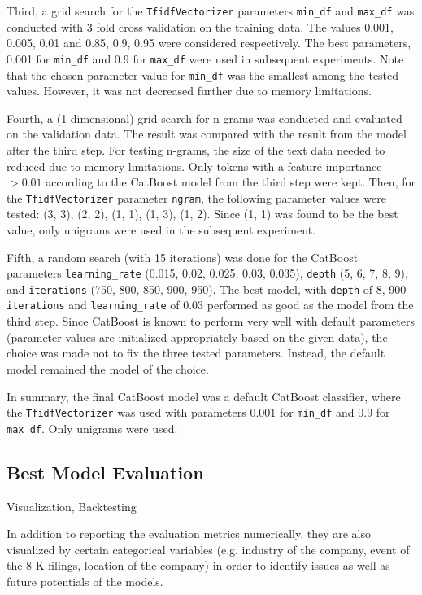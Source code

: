 \documentclass{article}
\begin{document}
	Third, a grid search for the \lstinline{TfidfVectorizer} parameters \lstinline{min_df} and \lstinline{max_df} was conducted with 3 fold cross validation on the training data. The values 0.001, 0.005, 0.01 and 0.85, 0.9, 0.95 were considered	respectively. The best parameters, 0.001 for \lstinline{min_df} and 0.9 for \lstinline{max_df} were used in subsequent experiments. Note that the chosen parameter value for \lstinline{min_df} was the smallest among the tested values. However, it was not decreased further due to memory limitations.
	
	Fourth, a (1 dimensional) grid search for n-grams was conducted and evaluated on the validation data. The result was compared with the result from the model after the third step. For testing n-grams, the size of the text data needed to reduced due to memory limitations. Only tokens with a feature importance $>0.01$ according to the CatBoost model from the third step were kept. Then, for the \lstinline{TfidfVectorizer} parameter \lstinline{ngram}, the following parameter values were tested: (3, 3), (2, 2), (1, 1), 
	(1, 3), (1, 2). Since (1, 1) was found to be the best value, only unigrams were used in the subsequent experiment.
	
	Fifth, a random search (with 15 iterations) was done for the CatBoost parameters \lstinline{learning_rate} (0.015, 0.02, 0.025, 0.03, 0.035), \lstinline{depth} (5, 6, 7, 8, 9), and \lstinline{iterations} (750, 800, 850, 900, 950). The best model, with \lstinline{depth} of 8, 900 \lstinline{iterations} and \lstinline{learning_rate} of 0.03 performed as good as the model from the third step. Since CatBoost is known to perform very well with default parameters (parameter values are initialized appropriately based on the given data), the choice was made not to fix the three tested parameters. Instead, the default model remained the model of the choice.
	
	In summary, the final CatBoost model was a default CatBoost classifier, where the \lstinline{TfidfVectorizer} was used with parameters 0.001 for \lstinline{min_df} and 0.9 for \lstinline{max_df}. Only unigrams were used.
	

	\subsection{Best Model Evaluation}
	
	Visualization, Backtesting
	
	In addition to reporting the evaluation metrics numerically, they are also visualized by certain categorical variables (e.g. industry of the company, event of the 8-K filings, location of the company) in order to identify issues as well as future potentials of the models. 
	
\end{document}
